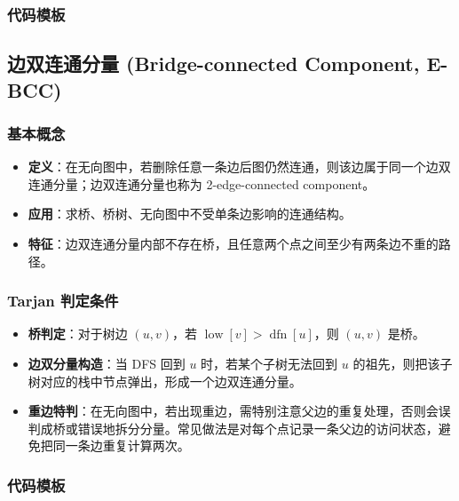 \subsubsection{代码模板}



\subsection{边双连通分量 (Bridge-connected Component, E-BCC)}

\subsubsection{基本概念}

\begin{itemize}
  \item \textbf{定义}：在无向图中，若删除任意一条边后图仍然连通，则该边属于同一个边双连通分量；边双连通分量也称为 2-edge-connected component。
  \item \textbf{应用}：求桥、桥树、无向图中不受单条边影响的连通结构。
  \item \textbf{特征}：边双连通分量内部不存在桥，且任意两个点之间至少有两条边不重的路径。
\end{itemize}

\subsubsection{Tarjan 判定条件}

\begin{itemize}
  \item \textbf{桥判定}：对于树边 $(u, v)$，若 $\operatorname{low}[v] > \operatorname{dfn}[u]$，则 $(u, v)$ 是桥。
  \item \textbf{边双分量构造}：当 DFS 回到 $u$ 时，若某个子树无法回到 $u$ 的祖先，则把该子树对应的栈中节点弹出，形成一个边双连通分量。
  \item \textbf{重边特判}：在无向图中，若出现重边，需特别注意父边的重复处理，否则会误判成桥或错误地拆分分量。常见做法是对每个点记录一条父边的访问状态，避免把同一条边重复计算两次。
\end{itemize}

\subsubsection{代码模板}



